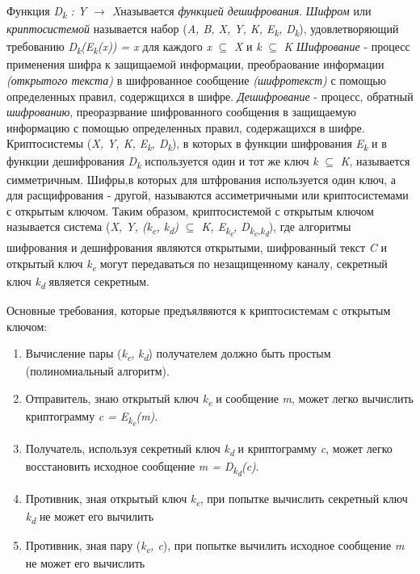   Функция \textit{D\textsubscript{k} : \textit{Y} {$\rightarrow$} \textit{X}}называется \textit{функцией дешифрования}.
  \textit{Шифром} или \textit{криптосистемой} называется набор (\textit{A, B, X, Y, K, E\textsubscript{k}, D\textsubscript{k}}), удовлетворяющий 
требованию \textit{D\textsubscript{k}(E\textsubscript{k}(x)) = x} для каждого \textit{x} {$\subseteq$} \textit{X} и \textit{k} {$\subseteq$} \textit{K}
  \textit{Шифрование} - процесс применения шифра к защищаемой информации, преобраование информации \textit{(открытого текста)} в шифрованное сообщение 
\textit{(шифротекст)} с помощью определенных правил, содержщихся в шифре.
  \textit{Дешифрование} - процесс, обратный \textit{шифрованию}, преоразрвание шифрованного сообщения в защищаемую информацию с помощью определенных 
правил, содержащихся в шифре.
  Криптосистемы (\textit{X, Y, K, E\textsubscript{k}, D\textsubscript{k}}), в которых в функции шифрования \textit{E\textsubscript{k}} и в функции 
дешифрования \textit{D\textsubscript{k}} используется один и тот же ключ \textit{k} {$\subseteq$} \textit{K}, называется симметричным. Шифры,в которых 
для штфрования используется один ключ, а для расщифрования - другой, называются ассиметричными или криптосистемами с открытым ключом. Таким образом, 
криптосистемой с открытым ключом называется система 
(\textit{X, Y, (k\textsubscript{e}, k\textsubscript{d}) {$\subseteq$} K, E\textsubscript{k\textsubscript{e}}, D\textsubscript{k\textsubscript{e},k\textsubscript{d}}}), 
где алгоритмы шифрования и дешифрования являются открытыми, шифрованный текст \textit{C} и открытый ключ \textit{k\textsubscript{e}} могут 
передаваться по незащищенному каналу, секретный ключ \textit{k\textsubscript{d}} является секретным.

Основные требования, которые предъялвяются к криптосистемам с открытым ключом:
\begin{enumerate}
	\item Вычисление пары (\textit{k\textsubscript{e}}, \textit{k\textsubscript{d}}) получателем должно быть простым (полиномиальный алгоритм).
	\item Отправитель, знаю открытый ключ \textit{k\textsubscript{e}} и сообщение \textit{m}, может легко вычислить криптограмму 
\textit{c = E\textsubscript{k\textsubscript{e}}(m)}.
	\item Получатель, используя секретный ключ \textit{k\textsubscript{d}} и криптограмму \textit{c}, может легко восстановить исходное сообщение 
\textit{m = D\textsubscript{k\textsubscript{d}}(c)}.
	\item Противник, зная открытый ключ \textit{k\textsubscript{e}}, при попытке вычислить секретный ключ \textit{k\textsubscript{d}} не может его 
вычилить
	\item Противник, зная пару (\textit{k\textsubscript{e}, c}), при попытке вычилить исходное сообщение \textit{m} не может его вычислить
\end{enumerate}

